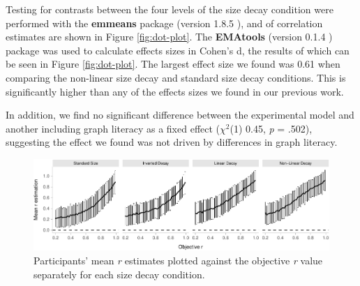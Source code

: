 \documentclass{vgtc}                          %
\begin{document}
Testing for contrasts between the four levels of the size decay condition
were performed with the \textbf{emmeans} package (version 1.8.5 \cite{emmeans}), and
of correlation estimates are shown in Figure \ref{fig:dot-plot}. The \textbf{EMAtools} (version
0.1.4 \cite{ematools}) package
was used to calculate effects sizes in Cohen's d, the results of which can be seen in Figure
\ref{fig:dot-plot}. The largest effect size we found was 0.61 when comparing
the non-linear size decay and standard size decay conditions. This is significantly higher
than any of the effects sizes we found in our previous work.

\begin{table}

\caption{\label{tab:contrasts-table}Contrasts between each of the four levels of the size decay condition.}
\centering
{}
\end{table}

In addition, we find no significant difference between the experimental model
and another including graph literacy as a fixed effect (\(\chi^2\)(1) 0.45, \emph{p} = .502), suggesting the effect we found was not driven by differences in graph literacy.

\begin{figure}[h]

{\centering \includegraphics[width=1\linewidth]{size_and_scatterplots_files/figure-latex/error-plot-1} 

}

\caption{Participants' mean \textit{r} estimates plotted against the objective \textit{r} value separately for each size decay condition.}\label{fig:error-plot}
\end{figure}
\end{document}
